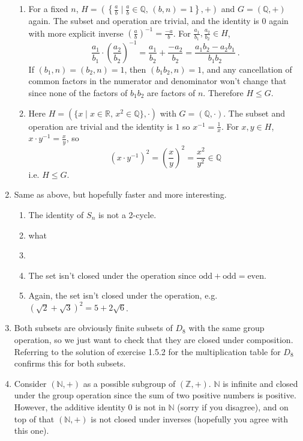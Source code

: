 \documentclass[]{article}
\newcommand{\bbz}{\mathbb{Z}}
\newcommand{\bbq}{\mathbb{Q}}
\newcommand{\bbr}{\mathbb{R}}
\newcommand{\bbn}{\mathbb{N}}
\begin{document}
\begin{enumerate}
\begin{enumerate}
\item For a fixed $n$, $H = \left( \left\{ \frac{a}{b}\mid \frac{a}{b}\in\bbq,\, (b,n)=1 \right\}, + \right)$ and $G = (\bbq, +)$ again. The subset and operation are trivial, and the identity is $0$ again with more explicit inverse $\left( \frac{a}{b} \right)^{-1} = \frac{-a}{b}$. For $\frac{a_1}{b_1},\frac{a_2}{b_2}\in H$,
\begin{equation}
\frac{a_1}{b_1}\cdot \left( \frac{a_2}{b_2} \right)^{-1} = \frac{a_1}{b_2}+ \frac{-a_2}{b_2} = \frac{a_1b_2-a_2b_1}{b_1b_2}\ .
\end{equation}
If $(b_1,n) = (b_2,n) = 1$, then $(b_1b_2,n) = 1$, and any cancellation of common factors in the numerator and denominator won't change that since none of the factors of $b_1b_2$ are factors of $n$. Therefore $H \leq G$.

\item Here $H = ( \{ x\mid x\in\bbr,\, x^2\in\bbq \}, \cdot)$ with $G = (\bbq,\cdot)$. The subset and operation are trivial and the identity is $1$ so $x^{-1} = \frac{1}{x}$. For $x,y\in H$, $x\cdot y^{-1} = \frac{x}{y}$, so 
\begin{equation}
(x\cdot y^{-1})^2 = \left(\frac{x}{y}\right)^2 = \frac{x^2}{y^2} \in \bbq
\end{equation}
i.e. $H\leq G$.

\end{enumerate}


\item Same as above, but hopefully faster and more interesting.
\begin{enumerate}
\item The identity of $S_n$ is not a 2-cycle.
\item {\color{red} what}
\item 
\item The set isn't closed under the operation since $\text{odd} + \text{odd} = \text{even}$.
\item Again, the set isn't closed under the operation, e.g. $(\sqrt{2} + \sqrt{3})^2 = 5 + 2\sqrt{6}$.
\end{enumerate}


\item Both subsets are obviously finite subsets of $D_8$ with the same group operation, so we just want to check that they are closed under composition. Referring to the solution of exercise 1.5.2 for the multiplication table for $D_8$ confirms this for both subsets.


\item Consider $(\bbn,+)$ as a possible subgroup of $(\bbz,+)$. $\bbn$ is infinite and closed under the group operation since the sum of two positive numbers is positive. However, the additive identity $0$ is not in $\bbn$ (sorry if you disagree), and on top of that $(\bbn,+)$ is not closed under inverses (hopefully you agree with this one).



\end{enumerate}
\end{document}
